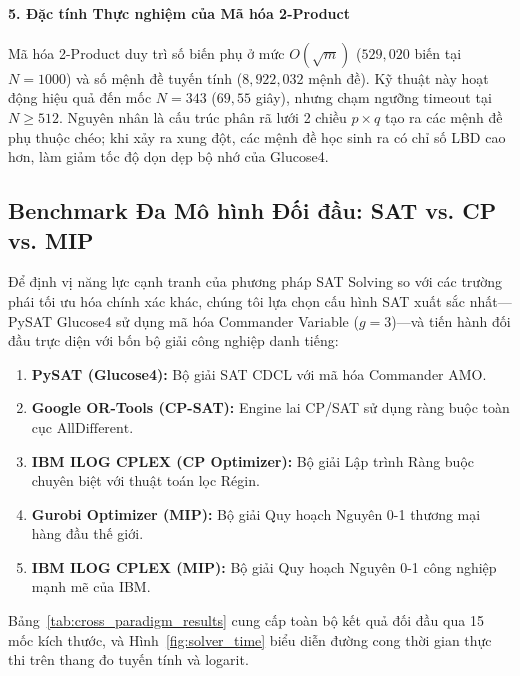 \documentclass[a4paper,fleqn]{cas-sc}
\begin{document}
\paragraph{5. Đặc tính Thực nghiệm của Mã hóa 2-Product}
Mã hóa 2-Product duy trì số biến phụ ở mức $O(\sqrt{m})$ ($529{,}020$ biến tại $N = 1000$) và số mệnh đề tuyến tính ($8{,}922{,}032$ mệnh đề). Kỹ thuật này hoạt động hiệu quả đến mốc $N = 343$ ($69{,}55$ giây), nhưng chạm ngưỡng timeout tại $N \ge 512$. Nguyên nhân là cấu trúc phân rã lưới 2 chiều $p \times q$ tạo ra các mệnh đề phụ thuộc chéo; khi xảy ra xung đột, các mệnh đề học sinh ra có chỉ số LBD cao hơn, làm giảm tốc độ dọn dẹp bộ nhớ của Glucose4.

\subsection{Benchmark Đa Mô hình Đối đầu: SAT vs. CP vs. MIP}
Để định vị năng lực cạnh tranh của phương pháp SAT Solving so với các trường phái tối ưu hóa chính xác khác, chúng tôi lựa chọn cấu hình SAT xuất sắc nhất---PySAT Glucose4 sử dụng mã hóa Commander Variable ($g=3$)---và tiến hành đối đầu trực diện với bốn bộ giải công nghiệp danh tiếng:
\begin{enumerate}
    \item \textbf{PySAT (Glucose4):} Bộ giải SAT CDCL với mã hóa Commander AMO.
    \item \textbf{Google OR-Tools (CP-SAT):} Engine lai CP/SAT sử dụng ràng buộc toàn cục $\text{AllDifferent}$.
    \item \textbf{IBM ILOG CPLEX (CP Optimizer):} Bộ giải Lập trình Ràng buộc chuyên biệt với thuật toán lọc Régin.
    \item \textbf{Gurobi Optimizer (MIP):} Bộ giải Quy hoạch Nguyên 0-1 thương mại hàng đầu thế giới.
    \item \textbf{IBM ILOG CPLEX (MIP):} Bộ giải Quy hoạch Nguyên 0-1 công nghiệp mạnh mẽ của IBM.
\end{enumerate}

Bảng~\ref{tab:cross_paradigm_results} cung cấp toàn bộ kết quả đối đầu qua 15 mốc kích thước, và Hình~\ref{fig:solver_time} biểu diễn đường cong thời gian thực thi trên thang đo tuyến tính và logarit.
\end{document}
